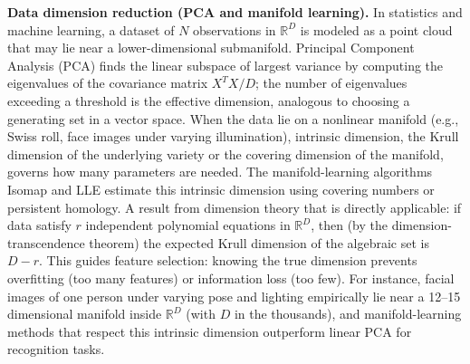 \theoryapplications
{}
\noindent\textbf{Data dimension reduction (PCA and manifold learning).} In statistics and machine learning, a dataset of $N$ observations in $\mathbb R^D$ is modeled as a point cloud that may lie near a lower-dimensional submanifold. Principal Component Analysis (PCA) finds the linear subspace of largest variance by computing the eigenvalues of the covariance matrix $X^TX/D$; the number of eigenvalues exceeding a threshold is the effective dimension, analogous to choosing a generating set in a vector space. When the data lie on a nonlinear manifold (e.g., Swiss roll, face images under varying illumination), intrinsic dimension, the Krull dimension of the underlying variety or the covering dimension of the manifold, governs how many parameters are needed. The manifold-learning algorithms Isomap and LLE estimate this intrinsic dimension using covering numbers or persistent homology. A result from dimension theory that is directly applicable: if data satisfy $r$ independent polynomial equations in $\mathbb R^D$, then (by the dimension-transcendence theorem) the expected Krull dimension of the algebraic set is $D-r$. This guides feature selection: knowing the true dimension prevents overfitting (too many features) or information loss (too few). For instance, facial images of one person under varying pose and lighting empirically lie near a 12--15 dimensional manifold inside $\mathbb R^{D}$ (with $D$ in the thousands), and manifold-learning methods that respect this intrinsic dimension outperform linear PCA for recognition tasks.
